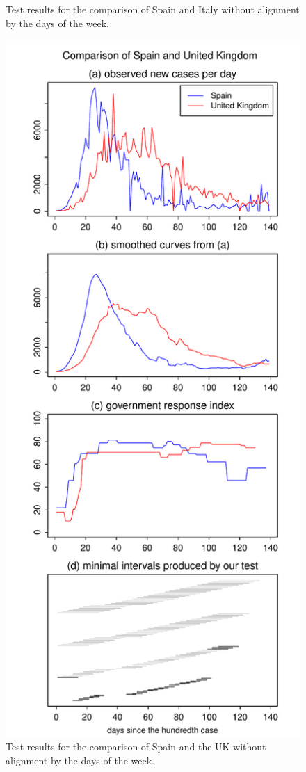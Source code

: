 \documentclass[a4paper,12pt]{article}
\numberwithin{equation}{section}
\begin{document}
\begin{figure}[p!]
\begin{minipage}[t]{0.49\textwidth}
\caption{Test results for the comparison of Spain and Italy without alignment by the days of the week.}
\end{minipage}
\hspace{0.25cm}
\begin{minipage}[t]{0.49\textwidth}
\includegraphics[width=\textwidth]{plots/ESP_vs_GBR}
\caption{Test results for the comparison of Spain and the UK without alignment by the days of the week.}
\end{minipage}
\end{figure}
\end{document}

